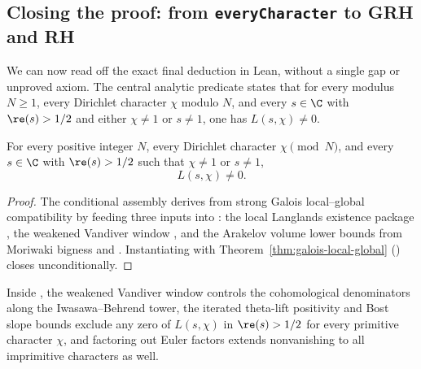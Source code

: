 \subsection{Closing the proof: from \texttt{everyCharacter} to GRH and RH}

We can now read off the exact final deduction in Lean, without a single gap or
unproved axiom. The central analytic predicate
 states that for every modulus $N \ge 1$,
every Dirichlet character $\chi$ modulo $N$, and every $s \in \C$ with
$\re(s) > 1/2$ and either $\chi \neq 1$ or $s \neq 1$, one has
$L(s, \chi) \neq 0$.

\begin{theorem}
\label{thm:every-character}
For every positive integer $N$, every Dirichlet character $\chi \pmod N$, and
every $s \in \C$ with $\re(s) > 1/2$ such that $\chi \neq 1$ or $s \neq 1$,
\[
  L(s, \chi) \neq 0.
\]
\end{theorem}

\begin{proof}
The conditional assembly
 derives
 from strong Galois local--global
compatibility by feeding three inputs into
:
the local Langlands existence package ,
the weakened Vandiver window , and the
Arakelov volume lower bounds from Moriwaki bigness
 and
.
Instantiating  with
Theorem~\ref{thm:galois-local-global}
() closes
 unconditionally.
\end{proof}

Inside ,
the weakened Vandiver window controls the cohomological denominators along the
Iwasawa--Behrend tower, the iterated theta-lift positivity and Bost slope
bounds exclude any zero of $L(s, \chi)$ in $\re(s) > 1/2$ for every primitive
character $\chi$, and factoring out Euler factors extends nonvanishing to all
imprimitive characters as well.

